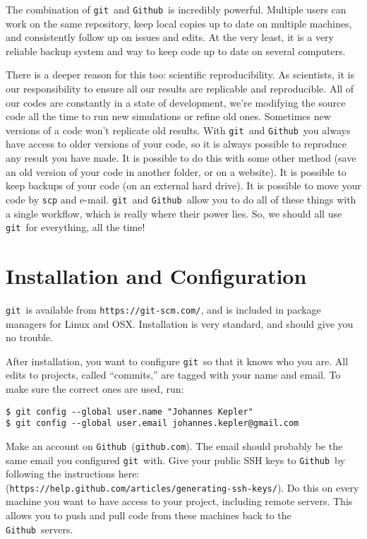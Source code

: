 \documentclass[14pt]{amsart}
\newcommand{\git}{{\texttt{git}}}
\newcommand{\github}{{\texttt{Github}}}
\begin{document}
The combination of \git\ and \github\ is incredibly powerful.  Multiple users can work on the same repository, keep local copies up to date on multiple machines, and consistently follow up on issues and edits.  At the very least, it is a very reliable backup system and way to keep code up to date on several computers.  

There is a deeper reason for this too: scientific reproducibility.  As scientists, it is our responsibility to ensure all our results are replicable and reproducible.  All of our codes are constantly in a state of development, we're modifying the source code all the time to run new simulations or refine old ones.  Sometimes new versions of a code won't replicate old results.  With \git\ and \github\ you always have access to older versions of your code, so it is always possible to reproduce any result you have made.  It is possible to do this with some other method (save an old version of your code in another folder, or on a website).  It is possible to keep backups of your code (on an external hard drive).  It is possible to move your code by \texttt{scp} and e-mail.  \git\ and \github\  allow you to do all of these things with a single workflow, which is really where their power lies.  So, we should all use \git\ for everything, all the time!

\section{Installation and Configuration}

\git\ is available from \texttt{https://git-scm.com/}, and is included in package managers for Linux and OSX.  Installation is very standard, and should give you no trouble.

After installation, you want to configure \git\ so that it knows who you are. All edits to projects, called ``commits,'' are tagged with your name and email.  To make sure the correct ones are used, run:

\begin{lstlisting}
$ git config --global user.name "Johannes Kepler"
$ git config --global user.email johannes.kepler@gmail.com
\end{lstlisting}

Make an account on \github\ (\texttt{github.com}).  The email should probably be the same email you configured \git\ with.  Give your public SSH keys to \github\ by following the instructions here: (\texttt{https://help.github.com/articles/generating-ssh-keys/}).  Do this on every machine you want to have access to your project, including remote servers.  This allows you to push and pull code from these machines back to the \github\ servers.
\end{document}
